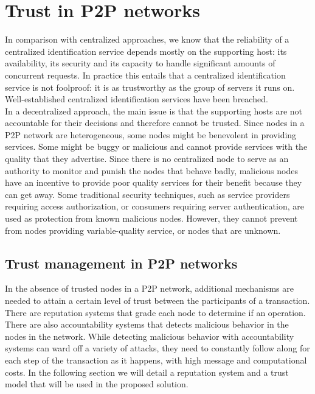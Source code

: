 \section{Trust in P2P networks}
\label{sec:trust_in_p2p}

In comparison with centralized approaches, we know that the reliability of a
centralized identification service depends mostly on the
supporting host: its availability, its security and its capacity  to handle
significant amounts of concurrent requests. 
In practice this entails that a centralized identification service is not
foolproof: it is as trustworthy as the group of servers it runs on.
Well-established centralized identification services have been breached.\\ %


In a decentralized approach, the main issue is that the supporting hosts are
not accountable for their decisions and therefore cannot be trusted.
Since nodes in a P2P network are heterogeneous, some nodes
might be benevolent in providing services. Some might be 
buggy or malicious and cannot provide services with the 
quality that they advertise. Since there is no centralized 
node to serve as an authority to monitor and punish the 
nodes that behave badly, malicious nodes have an incentive 
to provide poor quality services for their benefit because 
they can get away. Some traditional security techniques, 
such as service providers requiring access authorization, or 
consumers requiring server authentication, are used as 
protection from known malicious nodes. However,
 they cannot prevent from nodes providing variable-quality 
service, or nodes that are unknown.


\subsection{Trust management in P2P networks}
In the absence of trusted nodes in a P2P network, additional mechanisms are
needed to attain a certain level of trust between the participants of a transaction.
 There are reputation systems that grade each node to determine if an
operation. There are also accountability systems that detects malicious
behavior in the nodes in the network. While  detecting malicious behavior with
accountability systems can ward off a variety of attacks, they need to
constantly follow along for each step of the transaction as it happens, with
high message and computational costs.
 In the following section we will 
detail a reputation system and a trust model that will be used in the proposed
solution.


